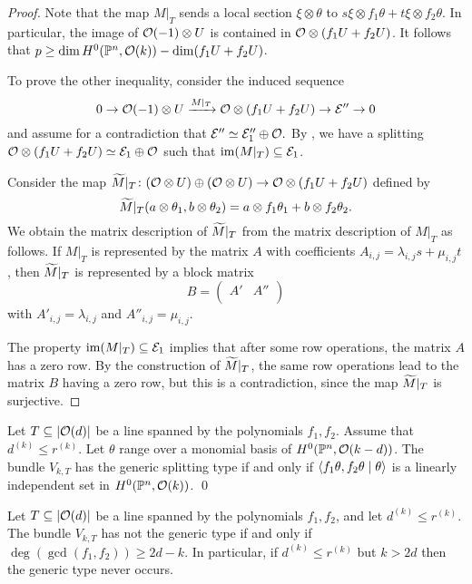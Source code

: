 \begin{proof}
	Note that the map $M|_T$ sends a local section $\xi \otimes \theta$ to $s\xi \otimes f_1 \theta + t\xi \otimes f_2 \theta$. In particular, the image of $\mathcal{O}(-1)\otimes U$ is contained in $\mathcal{O} \otimes (f_1 U + f_2 U)$. It follows that
	$p \geq \dim H^0(\mathbb{P}^n,\mathcal{O}(k)) - \dim ({f_1 U + f_2 U})$.

  To prove the other inequality, consider the induced sequence
  \[
  	0 \to \mathcal{O}(-1)\otimes U \xrightarrow{M|_T} \mathcal{O}\otimes (f_1 U + f_2 U) \to \mathcal{E}'' \to 0
  \]
  and assume for a contradiction that $\mathcal{E}'' \simeq \mathcal{E}_1''\oplus \mathcal{O}.$ By , we have a splitting $\mathcal{O}\otimes (f_1 U + f_2 U) \simeq \mathcal{E}_1 \oplus \mathcal{O}$ such that $\operatorname{im}(M|_T) \subseteq \mathcal{E}_1$. 

  Consider the map
  $\widetilde M|_T \colon (\mathcal{O} \otimes U) \oplus (\mathcal{O} \otimes U) \to \mathcal{O} \otimes (f_1 U + f_2 U)$
  defined by $$\widetilde M|_T(a\otimes \theta_1,b \otimes \theta_2)=a\otimes f_1 \theta_1 + b \otimes f_2 \theta_2.$$
  We obtain the matrix description of $\widetilde M|_T$ from the matrix description of $M|_T$ as follows. If $M|_T$ is represented by the matrix $A$ with coefficients $A_{i,j} = \lambda_{i,j} s + \mu_{i,j} t$, then $\widetilde M|_T$ is represented by a block matrix
  \[
  	B = \left(
  		\begin{array}{c|c}
  			A' & A'' \\
  		\end{array}
  	\right)
  \]
  with $A'_{i,j} = \lambda_{i,j}$ and $A''_{i,j} = \mu_{i,j}$.

  The property $\operatorname{im}(M|_T)\subseteq \mathcal{E}_1$ implies that after some row operations, the matrix $A$ has a zero row. By the construction of $\widetilde M|_T$, the same row operations lead to the matrix $B$ having a zero row, but this is a contradiction, since the map $\widetilde M|_T$ is surjective.
\end{proof}

\begin{corollary} \label{no-more-than-ones}
	Let $T \subseteq \lvert\mathcal{O} (d)\rvert$ be a line spanned by the polynomials $f_1,f_2$. Assume that $d^{(k)} \leq r^{(k)}$. Let $\theta$ range over a monomial basis of $H^0(\mathbb{P}^n, \mathcal{O}(k-d))$. The bundle $V_{k,T}$ has the generic splitting type if and only if
	$\left\langle f_1\theta,f_2\theta \mid \theta \right\rangle$ is a linearly independent set in $H^0(\mathbb{P}^n,\mathcal{O}(k))$. \qed
\end{corollary}

\begin{corollary} \label{nongeneral-type-shared-sections}
	Let $T \subseteq \lvert\mathcal{O} (d)\rvert$ be a line spanned by the polynomials $f_1,f_2$, and let $d^{(k)} \leq r^{(k)}$. The bundle $V_{k,T}$ has not the generic type if and only if $\deg(\gcd(f_1,f_2)) \geq 2d-k$. In particular, if $d^{(k)} \leq r^{(k)}$ but $k>2d$ then the generic type never occurs.
\end{corollary}

